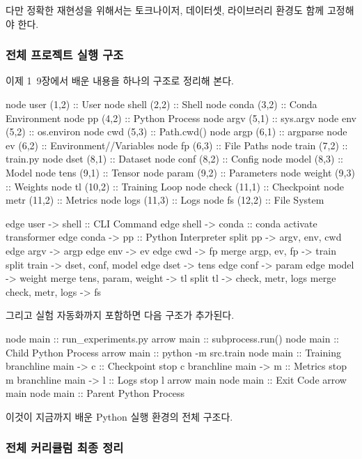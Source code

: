 다만 정확한 재현성을 위해서는 토크나이저, 데이터셋, 라이브러리 환경도 함께 고정해야 한다.

\subsubsection{전체 프로젝트 실행 구조}

이제 1~9장에서 배운 내용을 하나의 구조로 정리해 본다.

\begin{dhkdiagram}[in=4]
node user (1,2) :: User
node shell (2,2) :: Shell
node conda (3,2) :: Conda Environment
node pp (4,2) :: Python Process
node argv (5,1) :: sys.argv
node env (5,2) :: os.environ
node cwd (5,3) :: Path.cwd()
node argp (6,1) :: argparse
node ev (6,2) :: Environment//Variables
node fp (6,3) :: File Paths
node train (7,2) :: train.py
node dset (8,1) :: Dataset
node conf (8,2) :: Config
node model (8,3) :: Model
node tens (9,1) :: Tensor
node param (9,2) :: Parameters
node weight (9,3) :: Weights
node tl (10,2) :: Training Loop
node check (11,1) :: Checkpoint
node metr (11,2) :: Metrics
node logs (11,3) :: Logs
node fs (12,2) :: File System

edge user -> shell :: CLI Command
edge shell -> conda :: conda activate transformer
edge conda -> pp :: Python Interpreter
split pp -> argv, env, cwd
edge argv -> argp
edge env -> ev
edge cwd -> fp
merge argp, ev, fp -> train 
split train -> dset, conf, model 
edge dset -> tens
edge conf -> param
edge model -> weight
merge tens, param, weight -> tl
split tl -> check, metr, logs
merge check, metr, logs -> fs
\end{dhkdiagram}

그리고 실험 자동화까지 포함하면 다음 구조가 추가된다.

\begin{dhkbranch}[in=8]
node main :: run_experiments.py
arrow main :: subprocess.run()
node main :: Child Python Process
arrow main :: python -m src.train
node main :: Training
branchline main -> c :: Checkpoint
stop c
branchline main -> m :: Metrics
stop m
branchline main -> l :: Logs
stop l
arrow main
node main :: Exit Code
arrow main
node main :: Parent Python Process
\end{dhkbranch}

이것이 지금까지 배운 Python 실행 환경의 전체 구조다.

\subsubsection{전체 커리큘럼 최종 정리}

